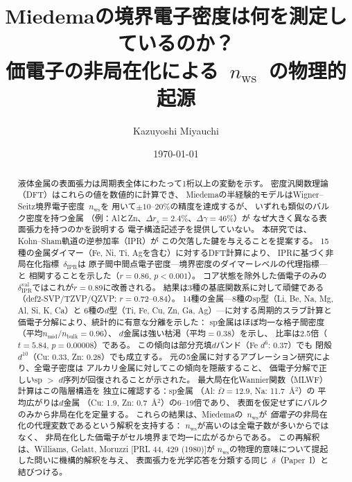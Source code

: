 \documentclass[twocolumn,showpacs,preprintnumbers,amsmath,amssymb,prb]{revtex4-2}
\begin{document}

\title{Miedemaの境界電子密度は何を測定しているのか？ \\
価電子の非局在化による~$n_\mathrm{ws}$~の物理的起源}

\author{Kazuyoshi Miyauchi}

\date{\today}

\begin{abstract}
液体金属の表面張力は周期表全体にわたって1桁以上の変動を示す。
密度汎関数理論（DFT）はこれらの値を数値的に計算でき、
Miedemaの半経験的モデルはWigner--Seitz境界電子密度~$n_\mathrm{ws}$を
用いて$\pm 10$--$20\%$の精度を達成するが、
いずれも類似のバルク密度を持つ金属
（例：AlとZn、$\Delta r_s = 2.4\%$、$\Delta\gamma = 46\%$）が
なぜ大きく異なる表面張力を持つのかを説明する
電子構造記述子を提供していない。
本研究では、Kohn--Sham軌道の逆参加率（IPR）が
この欠落した鍵を与えることを提案する。
15種の金属ダイマー（Fe, Ni, Ti, Agを含む）に対するDFT計算により、
IPRに基づく非局在化指標~$\delta_\mathrm{IPR}$は
原子間中間点電子密度---境界密度のダイマーレベルの代理指標---と
相関することを示した（$r = 0.86$, $p < 0.001$）。
コア状態を除外した価電子のみの
$\delta_\mathrm{IPR}^\mathrm{val}$ではこれが$r = 0.89$に改善される。
結果は3種の基底関数系に対して頑健である
（def2-SVP/TZVP/QZVP: $r = 0.72$--$0.84$）。
14種の金属---8種のsp型（Li, Be, Na, Mg, Al, Si, K, Ca）と
6種の$d$型（Ti, Fe, Cu, Zn, Ga, Ag）---に対する周期的スラブ計算と
価電子分解により、統計的に有意な分離を示した：
sp金属はほぼ均一な格子間密度
（平均$n_\mathrm{mid}/n_\mathrm{bulk} = 0.96$）、
$d$金属は強い枯渇（平均$= 0.38$）を示し、
比率は2.5倍（$t = 5.84$, $p = 0.00008$）である。
この傾向は部分充填$d$バンド（Fe $d^6$: 0.37）でも
閉殻$d^{10}$（Cu: 0.33, Zn: 0.28）でも成立する。
元の5金属に対するアブレーション研究により、全電子密度は
アルカリ金属に対してこの傾向を隠蔽すること、
価電子分解で正しいsp $>$ $d$序列が回復されることが示された。
最大局在化Wannier関数（MLWF）計算はこの階層構造を
独立に確認する：sp金属
（Al: $\bar{\Omega} = 12.9$, Na: 11.7~\AA$^2$）の
平均広がりは$d$金属
（Cu: 1.9, Zn: 0.7~\AA$^2$）の6--19倍であり、
表面を仮定せずにバルクのみから非局在化を定量する。
これらの結果は、Miedemaの~$n_\mathrm{ws}$が
\emph{価電子}の非局在化の代理変数であるという解釈を支持する：
$n_\mathrm{ws}$が高いのは全電子数が多いからではなく、
非局在化した価電子がセル境界まで均一に広がるからである。
この再解釈は、Williams, Gelatt, Moruzzi [PRL 44, 429 (1980)]が
$n_\mathrm{ws}$の物理的意味について提起した問いに機構的解釈を与え、
表面張力を光学応答を分類する同じ~$\delta$（Paper~I）と結びつける。
\end{abstract}
\end{document}
